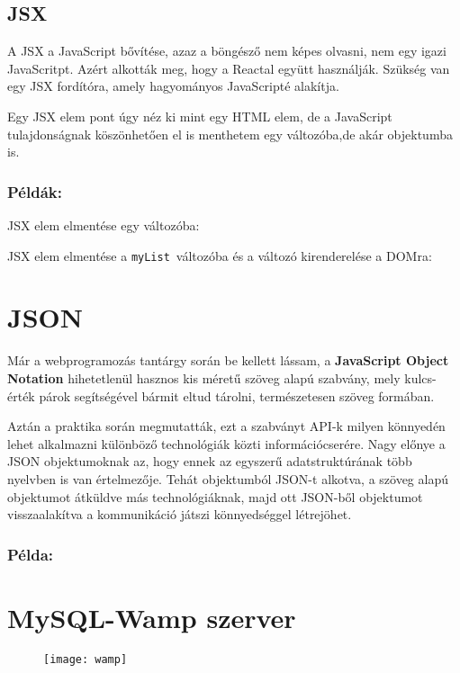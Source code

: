 \subsection{JSX}\label{subsec:ALTALAMISMERT:react:jsx}
A JSX a JavaScript bővítése, azaz a böngésző nem képes olvasni, nem egy igazi JavaScritpt. Azért alkották meg, hogy a Reactal együtt használják.
Szükség van egy JSX fordítóra, amely hagyományos JavaScripté alakítja.

Egy JSX elem pont úgy néz ki mint egy HTML elem, de a JavaScript tulajdonságnak köszönhetően el is menthetem egy változóba,de akár objektumba is.

\subsubsection{Példák:}\label{subsubsec:ALTALAMISMERT:react:jsx:pl}
JSX elem elmentése egy változóba:

JSX elem elmentése a \verb+myList+\ változóba és a változó kirenderelése a DOMra:

\section{JSON}\label{sec:ALTALAMISMERT:json}
Már a webprogramozás tantárgy során be kellett lássam, a {\bf JavaScript Object Notation} hihetetlenül hasznos kis méretű szöveg alapú szabvány, mely kulcs-érték párok segítségével bármit eltud tárolni, természetesen szöveg formában.

Aztán a praktika során megmutatták, ezt a szabványt API-k milyen könnyedén lehet alkalmazni különböző technológiák közti információcserére. Nagy előnye a JSON objektumoknak az, hogy ennek az egyszerű adatstruktúrának több nyelvben is van értelmezője. Tehát objektumból JSON-t alkotva, a szöveg alapú objektumot átküldve más technológiáknak, majd ott JSON-ből objektumot visszaalakítva a kommunikáció játszi könnyedséggel létrejöhet.
\subsubsection{Példa:}\label{subsubsec:ALTALAMISMERT:react:json:pl}

\section{MySQL-Wamp szerver}\label{sec:ALTALAMISMERT:mysql}
\begin{figure}[h]
	\centering
	\texttt{[image: wamp]}
\end{figure}
